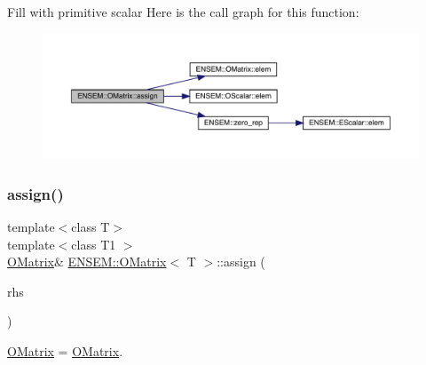 Fill with primitive scalar Here is the call graph for this function\+:
\nopagebreak
\begin{figure}[H]
\begin{center}
\leavevmode
\includegraphics[width=350pt]{dd/d80/classENSEM_1_1OMatrix_af0aaac940f907eb3db104e9f57b90a4f_cgraph}
\end{center}
\end{figure}
\mbox{\label{classENSEM_1_1OMatrix_a37ed216c9ecfe42f7a357573699b3bfc}} 
\subsubsection{\texorpdfstring{assign()}{assign()}\hspace{0.1cm}{\footnotesize\ttfamily [7/9]}}
{\footnotesize\ttfamily template$<$class T$>$ \\
template$<$class T1 $>$ \\
\mbox{\hyperlink{classENSEM_1_1OMatrix}{O\+Matrix}}\& \mbox{\hyperlink{classENSEM_1_1OMatrix}{E\+N\+S\+E\+M\+::\+O\+Matrix}}$<$ T $>$\+::assign (\begin{DoxyParamCaption}\item[{const \mbox{\hyperlink{classENSEM_1_1OMatrix}{O\+Matrix}}$<$ T1 $>$ \&}]{rhs }\end{DoxyParamCaption})\hspace{0.3cm}{\ttfamily [inline]}}



\mbox{\hyperlink{classENSEM_1_1OMatrix}{O\+Matrix}} = \mbox{\hyperlink{classENSEM_1_1OMatrix}{O\+Matrix}}. 


